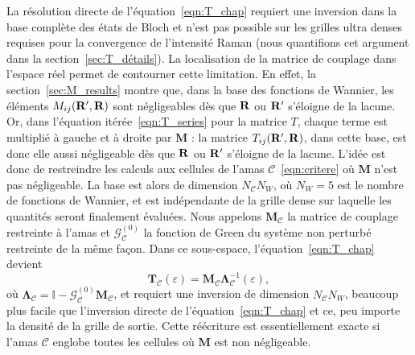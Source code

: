La résolution directe de l'équation~\eqref{eqn:T_chap} requiert une inversion dans la base complète des états de Bloch et n'est pas possible sur les grilles ultra denses requises pour la convergence de l'intensité Raman (nous quantifions cet argument dans la section~\ref{sec:T_détails}). La localisation de la matrice de couplage dans l'espace réel permet de contourner cette limitation. En effet, la section~\ref{sec:M_results} montre que, dans la base des fonctions de Wannier, les éléments $M_{ij}(\mathbf{R}',\mathbf{R})$ sont négligeables dès que $\mathbf{R}$ ou $\mathbf{R}'$ s'éloigne de la lacune. Or, dans l'équation itérée~\eqref{eqn:T_series} pour la matrice $T$, chaque terme est multiplié à gauche et à droite par $\bm M$ : la matrice $T_{ij}(\mathbf{R}',\mathbf{R})$, dans cette base, est donc elle aussi négligeable dès que $\mathbf{R}$ ou $\mathbf{R}'$ s'éloigne de la lacune. L'idée est donc de restreindre les calculs aux cellules de l'amas $\mathcal{C}$~\eqref{eqn:critere} où $\bm M$ n'est pas négligeable. La base est alors de dimension $N_\mathcal{C}N_W$, où $N_W=5$ est le nombre de fonctions de Wannier, et est indépendante de la grille dense sur laquelle les quantités seront finalement évaluées. Nous appelons $\bm M_\mathcal{C}$ la matrice de couplage restreinte à l'amas et $\bm{\mathcal{G}}^{(0)}_\mathcal{C}$ la fonction de Green du système non perturbé restreinte de la même façon. Dans ce sous-espace, l'équation~\eqref{eqn:T_chap} devient
\begin{equation}
   \bm T_\mathcal{C}(\varepsilon) = \bm M_\mathcal{C}\bm\Lambda^{-1}_\mathcal{C}(\varepsilon),\label{eqn:t_loc}
\end{equation}
où $\bm\Lambda_\mathcal{C}=\mathbb{I}-\bm{\mathcal{G}}^{(0)}_\mathcal{C}\bm M_\mathcal{C}$, et requiert une inversion de dimension $N_\mathcal{C}N_W$, beaucoup plus facile que l'inversion directe de l'équation~\eqref{eqn:T_chap} et ce, peu importe la densité de la grille de sortie. Cette réécriture est essentiellement exacte si l'amas $\mathcal{C}$ englobe toutes les cellules où $\bm M$ est non négligeable.

